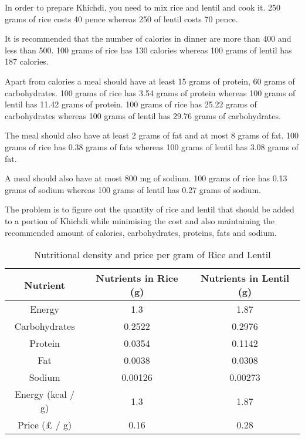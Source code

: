 \documentclass[
]{article}
\begin{document}
In order to prepare Khichdi, you need to mix rice and lentil and cook it.
250 grams of rice costs 40 pence whereas 250 of lentil costs 70 pence.

It is recommended that the number of calories in dinner are more than 400 and less than 500.
100 grams of rice has 130 calories whereas 100 grams of lentil has 187 calories.

Apart from calories a meal should have at least 15 grams of protein, 60 grams of carbohydrates.
100 grams of rice has 3.54 grams of protein whereas 100 grams of lentil has 11.42 grams of protein.
100 grams of rice has 25.22 grams of carbohydrates whereas 100 grams of lentil has 29.76 grams of carbohydrates.

The meal should also have at least 2 grams of fat and at most 8 grams of fat.
100 grams of rice has 0.38 grams of fats whereas 100 grams of lentil has 3.08 grams of fat.

A meal should also have at most 800 mg of sodium.
100 grams of rice has 0.13 grams of sodium whereas 100 grams of lentil has 0.27 grams of sodium.

The problem is to figure out the quantity of rice and lentil that should be added to a portion of Khichdi while minimising the cost and also maintaining the
recommended amount of calories, carbohydrates, proteins, fats and sodium.

\begin{table}[h!]
	\centering
	\begin{tabular}{||c | c | c|} 
		\hline
		Nutrient          & Nutrients in Rice (g) & Nutrients in Lentil (g) \\ [0.5ex] 
		\hline\hline
		Energy            & 1.3                   & 1.87                    \\ 
		Carbohydrates     & 0.2522                & 0.2976                  \\
		Protein           & 0.0354                & 0.1142                  \\
		Fat               & 0.0038                & 0.0308                  \\
		Sodium            & 0.00126               & 0.00273                 \\ [1ex] 
		\hline
		Energy (kcal / g) & 1.3                   & 1.87                    \\ 
		\hline
		Price (£ / g)    & 0.16                  & 0.28                    \\ [1ex] 
		\hline
	\end{tabular}
	\caption{Nutritional density and price per gram of Rice and Lentil}
	\label{table:2}
\end{table}
\end{document}
